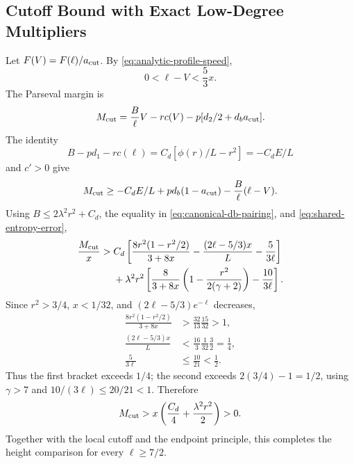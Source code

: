 \subsection{Cutoff Bound with Exact Low-Degree Multipliers}
\label{app:manual-cutoff-common}\label{app:pivotal-tail-extension}

Let \(F(V)=F(\ell)/a_{\rm cut}\). By
\eqref{eq:analytic-profile-speed},
\[
                  0<\ell-V<\frac53x.
\]
The Parseval margin is
\[
 M_{\rm cut}=\frac B\ell V-r c(V)
                  -p[d_2/2+d_ba_{\rm cut}].
\]
The identity
\[
 B-pd_1-r c(\ell)=C_d[\phi(r)/L-r^2]=-C_dE/L
\]
and \(c'>0\) give
\[
 M_{\rm cut}\ge-C_dE/L+p d_b(1-a_{\rm cut})
                              -\frac B\ell(\ell-V).
\]
Using \(B\le2\lambda^2r^2+C_d\), the equality in
\eqref{eq:canonical-db-pairing}, and \eqref{eq:shared-entropy-error},
\begin{align*}
 \frac{M_{\rm cut}}x>{}&C_d\left[
 \frac{8r^2(1-r^2/2)}{3+8x}-\frac{(2\ell-5/3)x}{L}
                                      -\frac5{3\ell}\right]\\
 &+\lambda^2r^2\left[
 \frac8{3+8x}\left(1-\frac{r^2}{2(\gamma+2)}\right)
                                      -\frac{10}{3\ell}\right].
\end{align*}
Since \(r^2>3/4\), \(x<1/32\), and
\((2\ell-5/3)e^{-\ell}\) decreases,
\begin{align*}
 \frac{8r^2(1-r^2/2)}{3+8x}&>\frac{32}{13}\frac{15}{32}>1,\\
 \frac{(2\ell-5/3)x}{L}&<\frac{16}{3}\frac1{32}\frac32=\frac14,\\
 \frac5{3\ell}&\le\frac{10}{21}<\frac12.
\end{align*}
Thus the first bracket exceeds \(1/4\); the second exceeds
\(2(3/4)-1=1/2\), using \(\gamma>7\) and
\(10/(3\ell)\le20/21<1\). Therefore
\[
              M_{\rm cut}>x\left(\frac{C_d}{4}
                                  +\frac{\lambda^2r^2}{2}\right)>0.
\]
Together with the local cutoff and the endpoint principle, this
completes the height comparison for every \(\ell\ge7/2\).
